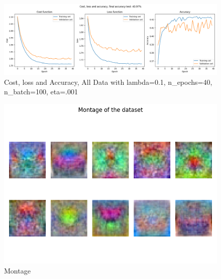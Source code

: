 \documentclass{article}
\begin{document}
\begin{figure}[H]
    \centering
    \includegraphics[width=\textwidth]{Result_Pics/cost_loss_accuracy_all_data_previous_0.1_40_100_0.001.png}
    \caption{Cost, loss and Accuracy, All Data with lambda=0.1, n\_epochs=40, n\_batch=100, eta=.001}
\end{figure}
\begin{figure}[H]
    \centering
    \includegraphics[scale=0.6]{Result_Pics/weights_all_data_previous_0.1_40_100_0.001.png}
    \caption{Montage}
\end{figure}
\end{document}

